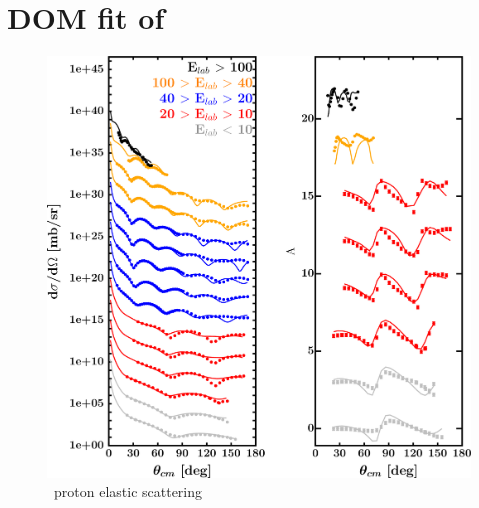 \section{DOM fit of \caEight}
\label{ca48DOMOutput}
\begin{figure}[hbtp]
    \centering
    \begin{minipage}{0.47\textwidth}
        \centering
        \includegraphics[width=\textwidth]{figures/ca48_protonElastic.png}
        \caption*{\caEight\ proton elastic scattering}
        \label{DOMFitData_ca48_proton_elastic}
    \end{minipage}\hspace{6pt}
    \begin{minipage}{0.47\textwidth}
        \centering

\end{minipage}
\end{figure}

